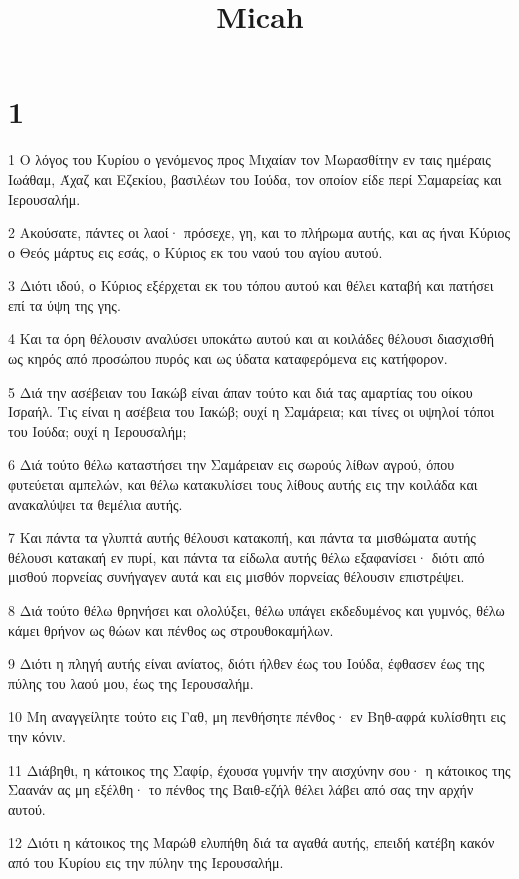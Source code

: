 

\title{Micah}


\chapter{1}

\par 1 Ο λόγος του Κυρίου ο γενόμενος προς Μιχαίαν τον Μωρασθίτην εν ταις ημέραις Ιωάθαμ, Άχαζ και Εζεκίου, βασιλέων του Ιούδα, τον οποίον είδε περί Σαμαρείας και Ιερουσαλήμ.
\par 2 Ακούσατε, πάντες οι λαοί· πρόσεχε, γη, και το πλήρωμα αυτής, και ας ήναι Κύριος ο Θεός μάρτυς εις εσάς, ο Κύριος εκ του ναού του αγίου αυτού.
\par 3 Διότι ιδού, ο Κύριος εξέρχεται εκ του τόπου αυτού και θέλει καταβή και πατήσει επί τα ύψη της γης.
\par 4 Και τα όρη θέλουσιν αναλύσει υποκάτω αυτού και αι κοιλάδες θέλουσι διασχισθή ως κηρός από προσώπου πυρός και ως ύδατα καταφερόμενα εις κατήφορον.
\par 5 Διά την ασέβειαν του Ιακώβ είναι άπαν τούτο και διά τας αμαρτίας του οίκου Ισραήλ. Τις είναι η ασέβεια του Ιακώβ; ουχί η Σαμάρεια; και τίνες οι υψηλοί τόποι του Ιούδα; ουχί η Ιερουσαλήμ;
\par 6 Διά τούτο θέλω καταστήσει την Σαμάρειαν εις σωρούς λίθων αγρού, όπου φυτεύεται αμπελών, και θέλω κατακυλίσει τους λίθους αυτής εις την κοιλάδα και ανακαλύψει τα θεμέλια αυτής.
\par 7 Και πάντα τα γλυπτά αυτής θέλουσι κατακοπή, και πάντα τα μισθώματα αυτής θέλουσι κατακαή εν πυρί, και πάντα τα είδωλα αυτής θέλω εξαφανίσει· διότι από μισθού πορνείας συνήγαγεν αυτά και εις μισθόν πορνείας θέλουσιν επιστρέψει.
\par 8 Διά τούτο θέλω θρηνήσει και ολολύξει, θέλω υπάγει εκδεδυμένος και γυμνός, θέλω κάμει θρήνον ως θώων και πένθος ως στρουθοκαμήλων.
\par 9 Διότι η πληγή αυτής είναι ανίατος, διότι ήλθεν έως του Ιούδα, έφθασεν έως της πύλης του λαού μου, έως της Ιερουσαλήμ.
\par 10 Μη αναγγείλητε τούτο εις Γαθ, μη πενθήσητε πένθος· εν Βηθ-αφρά κυλίσθητι εις την κόνιν.
\par 11 Διάβηθι, η κάτοικος της Σαφίρ, έχουσα γυμνήν την αισχύνην σου· η κάτοικος της Σαανάν ας μη εξέλθη· το πένθος της Βαιθ-εζήλ θέλει λάβει από σας την αρχήν αυτού.
\par 12 Διότι η κάτοικος της Μαρώθ ελυπήθη διά τα αγαθά αυτής, επειδή κατέβη κακόν από του Κυρίου εις την πύλην της Ιερουσαλήμ.
